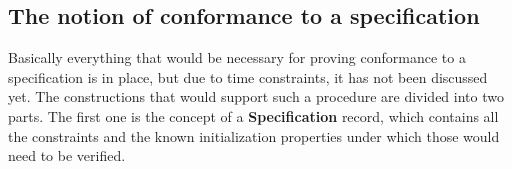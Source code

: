 \begin{code}
    \>[2]\AgdaSpace{}%
    \AgdaSymbol{:}\AgdaSpace{}%
    \AgdaSymbol{(}\AgdaSpace{}%
    \AgdaSpace{}%
    \AgdaSymbol{:}\AgdaSpace{}%
    \AgdaSymbol{)}\AgdaSpace{}%
    \AgdaSpace{}%
    \<%
    \\
    \>[2]\AgdaSpace{}%
    \AgdaSpace{}%
    \AgdaSpace{}%
    \AgdaSymbol{=}\AgdaSpace{}%
    \AgdaSymbol{(}\AgdaSpace{}%
    \AgdaOperator{\AgdaFunction{++}}\AgdaSpace{}%
    \AgdaSymbol{)}\<%
    \\
    \\[\AgdaEmptyExtraSkip]%
    \>[2]\AgdaSpace{}%
    \AgdaSpace{}%
    \<%
    \\
    \>[2]\AgdaSpace{}%
    \AgdaSymbol{:}\AgdaSpace{}%
    \AgdaSymbol{(}\AgdaSpace{}%
    \AgdaSpace{}%
    \AgdaSymbol{:}\AgdaSpace{}%
    \AgdaSymbol{)}\AgdaSpace{}%
    \AgdaSpace{}%
    \<%
    \\
    \>[2]\AgdaSpace{}%
    \AgdaSpace{}%
    \AgdaSpace{}%
    \AgdaSymbol{=}\AgdaSpace{}%
    \AgdaSpace{}%
    \AgdaSpace{}%
    \<%
\end{code}

\subsection{The notion of conformance to a specification}

Basically everything that would be necessary for proving conformance to a specification is in place, but due to time constraints, it has not been discussed yet. The constructions that would support such a procedure are divided into two parts. The first one is the concept of a \textbf{Specification} record, which contains all the constraints and the known initialization properties under which those would need to be verified.


